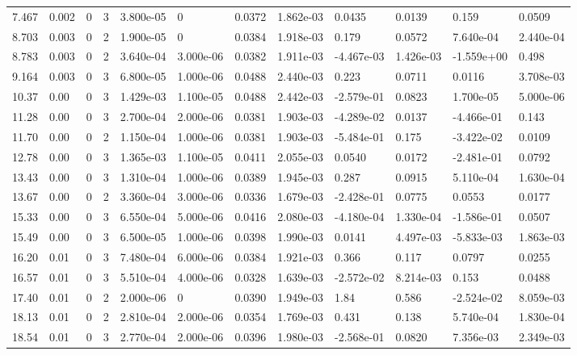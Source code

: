 \documentclass[preview]{standalone}
\begin{document}
{{\begin{tabular}{L{1.2cm}C{1.2cm} C{0.3cm}C{0.5cm} C{1.4cm}C{1.4cm} C{1.4cm}C{1.4cm} C{1.6cm}C{1.6cm} C{1.6cm}C{1.6cm}}
  7.467  &  0.002  & 0     &  3 &  3.800e-05  & 0  &  0.0372&   1.862e-03& 0.0435 & 0.0139   &  0.159 & 0.0509  \\ 
  8.703  &  0.003  & 0     &  2 &  1.900e-05  & 0  &  0.0384&   1.918e-03& 0.179 & 0.0572   &  7.640e-04 & 2.440e-04  \\ 
  8.783  &  0.003  & 0     &  2 &  3.640e-04  & 3.000e-06  &  0.0382&   1.911e-03& -4.467e-03 & 1.426e-03   &  -1.559e+00 & 0.498  \\ 
  9.164  &  0.003  & 0     &  3 &  6.800e-05  & 1.000e-06  &  0.0488&   2.440e-03& 0.223 & 0.0711   &  0.0116 & 3.708e-03  \\ 
  10.37  &  0.00  & 0     &  3 &  1.429e-03  & 1.100e-05  &  0.0488&   2.442e-03& -2.579e-01 & 0.0823   &  1.700e-05 & 5.000e-06  \\ 
  11.28  &  0.00  & 0     &  3 &  2.700e-04  & 2.000e-06  &  0.0381&   1.903e-03& -4.289e-02 & 0.0137   &  -4.466e-01 & 0.143  \\ 
  11.70  &  0.00  & 0     &  2 &  1.150e-04  & 1.000e-06  &  0.0381&   1.903e-03& -5.484e-01 & 0.175   &  -3.422e-02 & 0.0109  \\ 
  12.78  &  0.00  & 0     &  3 &  1.365e-03  & 1.100e-05  &  0.0411&   2.055e-03& 0.0540 & 0.0172   &  -2.481e-01 & 0.0792  \\ 
  13.43  &  0.00  & 0     &  3 &  1.310e-04  & 1.000e-06  &  0.0389&   1.945e-03& 0.287 & 0.0915   &  5.110e-04 & 1.630e-04  \\ 
  13.67  &  0.00  & 0     &  2 &  3.360e-04  & 3.000e-06  &  0.0336&   1.679e-03& -2.428e-01 & 0.0775   &  0.0553 & 0.0177  \\ 
  15.33  &  0.00  & 0     &  3 &  6.550e-04  & 5.000e-06  &  0.0416&   2.080e-03& -4.180e-04 & 1.330e-04   &  -1.586e-01 & 0.0507  \\ 
  15.49  &  0.00  & 0     &  3 &  6.500e-05  & 1.000e-06  &  0.0398&   1.990e-03& 0.0141 & 4.497e-03   &  -5.833e-03 & 1.863e-03  \\ 
  16.20  &  0.01  & 0     &  3 &  7.480e-04  & 6.000e-06  &  0.0384&   1.921e-03& 0.366 & 0.117   &  0.0797 & 0.0255  \\ 
  16.57  &  0.01  & 0     &  3 &  5.510e-04  & 4.000e-06  &  0.0328&   1.639e-03& -2.572e-02 & 8.214e-03   &  0.153 & 0.0488  \\ 
  17.40  &  0.01  & 0     &  2 &  2.000e-06  & 0  &  0.0390&   1.949e-03& 1.84 & 0.586   &  -2.524e-02 & 8.059e-03  \\ 
  18.13  &  0.01  & 0     &  2 &  2.810e-04  & 2.000e-06  &  0.0354&   1.769e-03& 0.431 & 0.138   &  5.740e-04 & 1.830e-04  \\ 
  18.54  &  0.01  & 0     &  3 &  2.770e-04  & 2.000e-06  &  0.0396&   1.980e-03& -2.568e-01 & 0.0820   &  7.356e-03 & 2.349e-03  \\ 
\hline 
\end{tabular} 

}}
\end{document}

